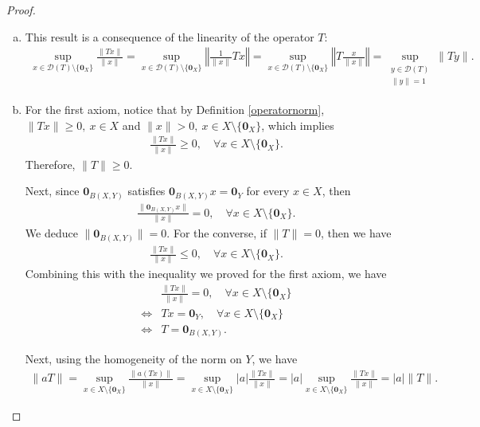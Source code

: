\documentclass[11pt]{article}
\theoremstyle{mystyle}
\newcommand{\0}{\mathbf{0}}
\begin{document}
\begin{proof}
\begin{enumerate}[(a)]
    \item This result is a consequence of the linearity of the operator $T$:
    \begin{align*}
        \sup_{x \in \mathscr{D}(T)\setminus\{\0_X\}} \frac{\|Tx\|}{\|x\|} = 
        \sup_{x \in \mathscr{D}(T)\setminus\{\0_X\}} \left\Vert \frac{1}{\|x\|} Tx \right\Vert = \sup_{x \in \mathscr{D}(T)\setminus\{\0_X\}} \left\Vert T \frac{x}{\|x\|} \right\Vert = \sup_{\substack{y \in \mathscr{D}(T)\\ \|y\| = 1}} \|Ty\|.
    \end{align*}
    
    \item For the first axiom, notice that by Definition \ref{operatornorm}, $\|Tx\| \geq 0, \ x \in X$ and $\|x\| > 0, \ x \in X \setminus \{\0_X\}$, which implies
    \begin{align*}
        \frac{\|Tx\|}{\|x\|} \geq 0, \quad \forall x \in X \setminus \{\0_X\}.
    \end{align*}
    Therefore, $\|T\| \geq 0$. 
    
    Next, since $\0_{B(X, Y)}$ satisfies $\0_{B(X, Y)}x = \0_Y$ for every $x \in X$, then 
    \begin{align*}
        \frac{\|\0_{B(X, Y)}x\|}{\|x\|} = 0, \quad \forall x \in X \setminus \{\0_X\}.
    \end{align*}
    We deduce $\|\0_{B(X, Y)}\| = 0$. For the converse, if $\|T\| = 0$, then we have
    \begin{align*}
        \frac{\|Tx\|}{\|x\|} \leq 0, \quad \forall x \in X \setminus \{\0_X\}.
    \end{align*}
    Combining this with the inequality we proved for the first axiom, we have
    \begin{align*}
        &\frac{\|Tx\|}{\|x\|} = 0, \quad \forall x \in X \setminus \{\0_X\}\\
        \iff&Tx = \0_Y, \quad \forall x \in X \setminus \{\0_X\}\\
        \iff&T = \0_{B(X, Y)}.
    \end{align*}
    
    Next, using the homogeneity of the norm on $Y$, we have
    \begin{align*}
        \|aT\| = \sup_{x \in X\setminus\{\0_X\}} \frac{\|a(Tx)\|}{\|x\|} = \sup_{x \in X\setminus\{\0_X\}} |a| \frac{\|Tx\|}{\|x\|} = |a| \sup_{x \in X\setminus\{\0_X\}} \frac{\|Tx\|}{\|x\|} = |a| \|T\|.
    \end{align*}
    

\end{enumerate}
\end{proof}
\end{document}
